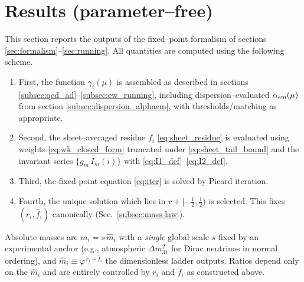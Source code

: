 \documentclass[%
  amsmath,amssymb,
  aps,
 prb,
 floatfix, showkeys
 ]{revtex4-2}
\begin{document}
     \section{Results (parameter--free)}
 \label{sec:results}
  This section reports the outputs of the fixed--point formalism of
 sections \ref{sec:formalism}--\ref{sec:running}. 
 All quantities are computed using the following scheme.
 \begin{enumerate}
 \item First, the function $\gamma_i(\mu)$ is assembled
   as described in sections  \ref{subsec:qed_ad}–\ref{subsec:ew_running},
   including dispersion–evaluated $\alpha_{\rm em}(\mu)$ from section
   \ref{subsec:dispersion_alphaem}, with thresholds/matching as appropriate.
 \item Second,  the sheet–averaged residue $f_i$ \eqref{eq:sheet_residue} is evaluated
   using weights \eqref{eq:wk_closed_form} truncated under \eqref{eq:sheet_tail_bound}
   and the invariant series $\{g_m\,I_m(i)\}$ with \eqref{eq:I1_def}–\eqref{eq:I2_def}.
 \item Third, the fixed point equation \eqref{eq:iter} is solved by Picard iteration.
 \item Fourth, the unique solution which lies in $r+[-\tfrac{1}{2},\tfrac{1}{2})$ is selected.
   This fixes $(r_i,\widehat f_i)$ canonically (Sec.~\ref{subsec:mass-law}).
 \end{enumerate}
 Absolute masses are $m_i = s\,\widehat m_i$ with a \emph{single} global scale $s$ fixed by
 an experimental anchor (e.g., atmospheric $\Delta m^2_{31}$ for Dirac neutrinos in normal ordering),
 and $\widehat m_i\equiv \varphi^{\,r_i+\widehat f_i}$ the dimensionless ladder outputs.
 Ratios depend only on the $\widehat m_i$ and are entirely controlled by $r_i$ and $f_i$ as constructed above.
 
\end{document}

